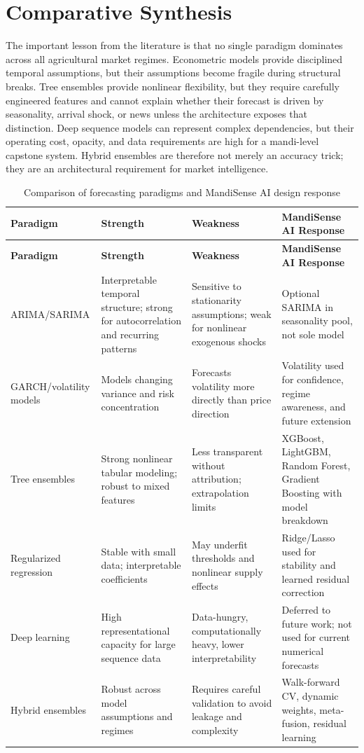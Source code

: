 \documentclass[12pt,a4paper]{report}
\begin{document}
\section{Comparative Synthesis}

The important lesson from the literature is that no single paradigm dominates across all agricultural market regimes. Econometric models provide disciplined temporal assumptions, but their assumptions become fragile during structural breaks. Tree ensembles provide nonlinear flexibility, but they require carefully engineered features and cannot explain whether their forecast is driven by seasonality, arrival shock, or news unless the architecture exposes that distinction. Deep sequence models can represent complex dependencies, but their operating cost, opacity, and data requirements are high for a mandi-level capstone system. Hybrid ensembles are therefore not merely an accuracy trick; they are an architectural requirement for market intelligence.

\begin{longtable}{|p{3.0cm}|p{3.6cm}|p{3.6cm}|p{4.0cm}|}
\caption{Comparison of forecasting paradigms and MandiSense AI design response}
\label{tab:paradigm_comparison}\\
\hline
\textbf{Paradigm} & \textbf{Strength} & \textbf{Weakness} & \textbf{MandiSense AI Response} \\
\hline
\endfirsthead
\hline
\textbf{Paradigm} & \textbf{Strength} & \textbf{Weakness} & \textbf{MandiSense AI Response} \\
\hline
\endhead
ARIMA/SARIMA & Interpretable temporal structure; strong for autocorrelation and recurring patterns & Sensitive to stationarity assumptions; weak for nonlinear exogenous shocks & Optional SARIMA in seasonality pool, not sole model \\
\hline
GARCH/volatility models & Models changing variance and risk concentration & Forecasts volatility more directly than price direction & Volatility used for confidence, regime awareness, and future extension \\
\hline
Tree ensembles & Strong nonlinear tabular modeling; robust to mixed features & Less transparent without attribution; extrapolation limits & XGBoost, LightGBM, Random Forest, Gradient Boosting with model breakdown \\
\hline
Regularized regression & Stable with small data; interpretable coefficients & May underfit thresholds and nonlinear supply effects & Ridge/Lasso used for stability and learned residual correction \\
\hline
Deep learning & High representational capacity for large sequence data & Data-hungry, computationally heavy, lower interpretability & Deferred to future work; not used for current numerical forecasts \\
\hline
Hybrid ensembles & Robust across model assumptions and regimes & Requires careful validation to avoid leakage and complexity & Walk-forward CV, dynamic weights, meta-fusion, residual learning \\
\hline
\end{longtable}
\end{document}

